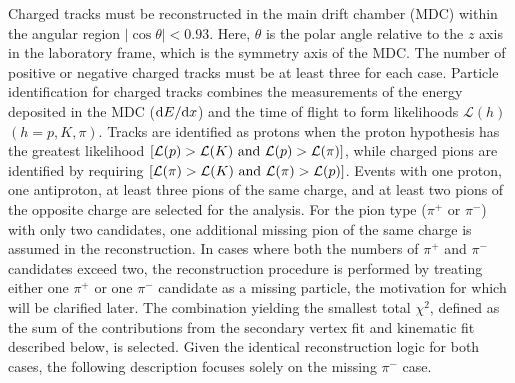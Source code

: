 \documentclass[prd,aps,reprint,noeprint,superscriptaddress,amsmath, amssymb]{revtex4-1}
\begin{document}
Charged tracks must be reconstructed in the main drift chamber (MDC) within the angular region $|\cos\theta|<0.93$. Here, $\theta$ is the polar angle relative to the $z$ axis in the laboratory frame, which is the symmetry axis of the MDC.
The number of positive or negative charged tracks must be at least three for each case.
Particle identification for charged tracks combines the measurements of the energy deposited in the MDC (${\rm d}E/{\rm d}x$) and the time of flight to form likelihoods $\mathcal{L}(h)$ $(h=p,K,\pi)$.
Tracks are identified as protons when the proton hypothesis has the greatest likelihood $[\mathcal{L}(p)>\mathcal{L}(K)~{\rm and}~\mathcal{L}(p)>\mathcal{L}(\pi)]$, while charged pions are identified by requiring $[\mathcal{L}(\pi)>\mathcal{L}(K)~{\rm and}~\mathcal{L}(\pi)>\mathcal{L}(p)]$.
Events with one proton, one antiproton, at least three pions of the same charge, and at least two pions of the opposite charge are selected for the analysis.
For the pion type ($\pi^+$ or $ \pi^-$) with only two candidates, one additional missing pion of the same charge is assumed in the reconstruction.
In cases where both the numbers of $\pi^+$ and $\pi^-$ candidates exceed two, the reconstruction procedure is performed by treating either one $\pi^+$ or one $\pi^-$ candidate as a missing particle, the motivation for which will be clarified later.
The combination yielding the smallest total $\chi^2$, defined as the sum of the contributions from the secondary vertex fit and kinematic fit described below, is selected.
Given the identical reconstruction logic for both cases, the following description focuses solely on the missing $\pi^-$ case.
\end{document}
